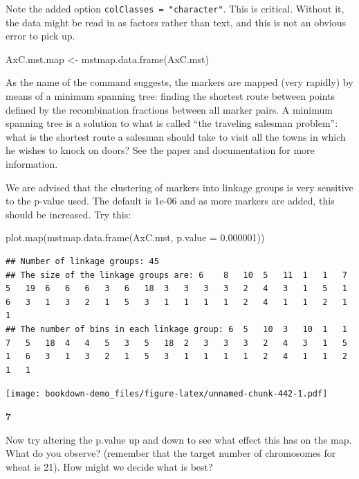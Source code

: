 \documentclass[
]{book}
\makeatletter
\newenvironment{Shaded}{\begin{snugshade}}{\end{snugshade}}
\newcommand{\AttributeTok}[1]{\textcolor[rgb]{0.77,0.63,0.00}{#1}}
\newcommand{\FloatTok}[1]{\textcolor[rgb]{0.00,0.00,0.81}{#1}}
\newcommand{\FunctionTok}[1]{\textcolor[rgb]{0.00,0.00,0.00}{#1}}
\newcommand{\NormalTok}[1]{#1}
\newcommand{\OtherTok}[1]{\textcolor[rgb]{0.56,0.35,0.01}{#1}}
\newenvironment{kframe}{%
\medskip{}
\setlength{\fboxsep}{.8em}
 \def\at@end@of@kframe{}%
 \ifinner\ifhmode%
  \def\at@end@of@kframe{\end{minipage}}%
  \begin{minipage}{\columnwidth}%
 \fi\fi%
 \def\FrameCommand##1{\hskip\@totalleftmargin \hskip-\fboxsep
 \colorbox{shadecolor}{##1}\hskip-\fboxsep
     \hskip-\linewidth \hskip-\@totalleftmargin \hskip\columnwidth}%
 \MakeFramed {\advance\hsize-\width
   \@totalleftmargin\z@ \linewidth\hsize
   \@setminipage}}%
 {\par\unskip\endMakeFramed%
 \at@end@of@kframe}
\newenvironment{rmdblock}[1]
  {
  \begin{itemize}
  \renewcommand{\labelitemi}{
    \raisebox{-.7\height}[0pt][0pt]{
      {\setkeys{Gin}{width=3em,keepaspectratio}\texttt{[image: images/\#1]}}
    }
  }
  \setlength{\fboxsep}{1em}
  \begin{kframe}
  \item
  }
  {
  \end{kframe}
  \end{itemize}
  }
\newenvironment{rmdquiz}
  {\begin{rmdblock}{quiz}}
  {\end{rmdblock}}
\makeatother
\begin{document}
Note the added option \texttt{colClasses\ =\ "character"}. This is critical. Without it, the data might be read in as factors rather than text, and this is not an obvious error to pick up.

\begin{Shaded}
\begin{Highlighting}[]
\NormalTok{AxC.mst.map }\OtherTok{\textless{}{-}} \FunctionTok{mstmap.data.frame}\NormalTok{(AxC.mst)}
\end{Highlighting}
\end{Shaded}

As the name of the command suggests, the markers are mapped (very rapidly) by means of a minimum spanning tree: finding the shortest route between points defined by the recombination fractions between all marker pairs. A minimum spanning tree is a solution to what is called ``the traveling salesman problem'': what is the shortest route a salesman should take to visit all the towns in which he wishes to knock on doors? See the paper and documentation for more information.

We are advised that the clustering of markers into linkage groups is very sensitive to the p-value used. The default is 1e-06 and as more markers are added, this should be increased. Try this:

\begin{Shaded}
\begin{Highlighting}[]
\FunctionTok{plot.map}\NormalTok{(}\FunctionTok{mstmap.data.frame}\NormalTok{(AxC.mst, }\AttributeTok{p.value =} \FloatTok{0.000001}\NormalTok{))}
\end{Highlighting}
\end{Shaded}

\begin{verbatim}
## Number of linkage groups: 45
## The size of the linkage groups are: 6    8   10  5   11  1   1   7   5   19  6   6   6   3   6   18  3   3   3   3   2   4   3   1   5   1   6   3   1   3   2   1   5   3   1   1   1   1   2   4   1   1   2   1   1   
## The number of bins in each linkage group: 6  5   10  3   10  1   1   7   5   18  4   4   5   3   5   18  2   3   3   3   2   4   3   1   5   1   6   3   1   3   2   1   5   3   1   1   1   1   2   4   1   1   2   1   1   
\end{verbatim}

\texttt{[image: bookdown-demo\_files/figure-latex/unnamed-chunk-442-1.pdf]}

\begin{rmdquiz}
\textbf{7}

Now try altering the p.value up and down to see what effect this has on the map. What do you observe? (remember that the target number of chromosomes for wheat is 21). How might we decide what is best?
\end{rmdquiz}
\end{document}
